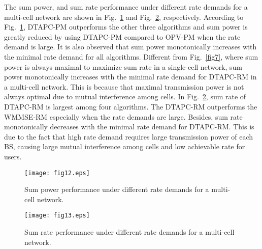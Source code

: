 \documentclass[journal]{IEEEtran}
\begin{document}
The sum power, and sum rate performance under different rate demands for a multi-cell network are shown in Fig.~\ref{fig15} and Fig.~\ref{fig16}, respectively.
According to Fig.~\ref{fig15}, DTAPC-PM outperforms the other three algorithms and sum power is greatly reduced by using DTAPC-PM compared to OPV-PM when the rate demand is large.
It is also observed that sum power monotonically increases with the minimal rate demand for all algorithms.
Different from Fig.~\ref{fig7}, where sum power is always maximal to maximize sum rate in a single-cell network,
sum power monotonically increases with the minimal rate demand for DTAPC-RM in a multi-cell network.
This is because that maximal transmission power is not always optimal due to mutual interference among cells.
In Fig.~\ref{fig16}, sum rate of DTAPC-RM is largest among four algorithms.
The DTAPC-RM outperforms the WMMSE-RM especially when the rate demands are large.
Besides, sum rate monotonically decreases with the minimal rate demand for DTAPC-RM.
This is due to the fact that high rate demand requires large transmission power of each BS,
causing large mutual interference among cells and low achievable rate for users.

\begin{figure}
\centering
\texttt{[image: fig12.eps]}
\vspace{-1em}
\caption{Sum power performance under different rate demands for a multi-cell network.\label{fig15}}
\vspace{-1em}
\end{figure}

\begin{figure}
\centering
\texttt{[image: fig13.eps]}
\vspace{-1em}
\caption{Sum rate performance under different rate demands for a multi-cell network.\label{fig16}}
\end{figure}
\end{document}
